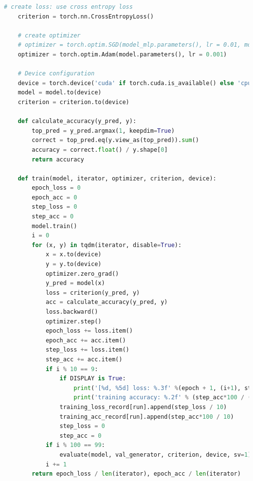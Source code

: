 \documentclass[3p,times,procedia]{elsarticle}
\begin{document}
\begin{lstlisting}[language=Python]
    # create loss: use cross entropy loss
    criterion = torch.nn.CrossEntropyLoss()
    
    # create optimizer
    # optimizer = torch.optim.SGD(model_mlp.parameters(), lr = 0.01, momentum = 0.0)
    optimizer = torch.optim.Adam(model.parameters(), lr = 0.001)
    
    # Device configuration
    device = torch.device('cuda' if torch.cuda.is_available() else 'cpu')
    model = model.to(device)
    criterion = criterion.to(device)
    
    def calculate_accuracy(y_pred, y):
        top_pred = y_pred.argmax(1, keepdim=True)
        correct = top_pred.eq(y.view_as(top_pred)).sum()
        accuracy = correct.float() / y.shape[0]
        return accuracy
    
    def train(model, iterator, optimizer, criterion, device):
        epoch_loss = 0
        epoch_acc = 0
        step_loss = 0
        step_acc = 0
        model.train()
        i = 0
        for (x, y) in tqdm(iterator, disable=True):
            x = x.to(device)
            y = y.to(device)
            optimizer.zero_grad()
            y_pred = model(x)
            loss = criterion(y_pred, y)
            acc = calculate_accuracy(y_pred, y)
            loss.backward()
            optimizer.step()
            epoch_loss += loss.item()
            epoch_acc += acc.item()
            step_loss += loss.item()
            step_acc += acc.item()
            if i % 10 == 9:
                if DISPLAY is True:                                                          # print every 10 mini-batches
                    print('[%d, %5d] loss: %.3f' %(epoch + 1, (i+1), step_loss / 10))    # each epoch has 5000/50 = 100 steps
                    print('training accuracy: %.2f' % (step_acc*100 / (10)) )            # printed at 10 step intervals
                training_loss_record[run].append(step_loss / 10)                          # save training loss with 10 step intervals
                training_acc_record[run].append(step_acc*100 / 10)                        # save training accuracy with 10 step intervals
                step_loss = 0
                step_acc = 0 
            if i % 100 == 99:
                evaluate(model, val_generator, criterion, device, sv=1)
            i += 1      
        return epoch_loss / len(iterator), epoch_acc / len(iterator)
    

\end{lstlisting}
\end{document}
